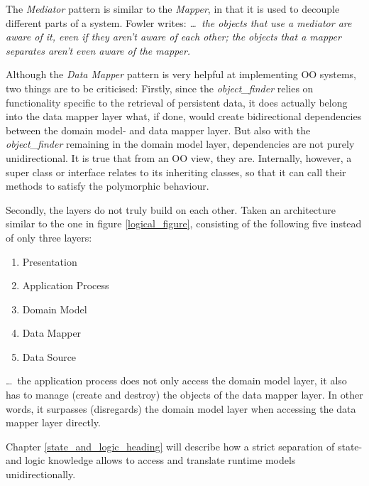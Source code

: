 The \emph{Mediator} pattern \cite{gamma1995} is similar to the \emph{Mapper}, in
that it is used to decouple different parts of a system. Fowler \cite{fowler2002}
writes: \textit{\ldots\ the objects that use a mediator are aware of it, even if
they aren't aware of each other; the objects that a mapper separates aren't even
aware of the mapper.}

Although the \emph{Data Mapper} pattern is very helpful at implementing OO
systems, two things are to be criticised: Firstly, since the \emph{object\_finder}
relies on functionality specific to the retrieval of persistent data, it does
actually belong into the data mapper layer what, if done, would create
bidirectional dependencies between the domain model- and data mapper layer. But
also with the \emph{object\_finder} remaining in the domain model layer,
dependencies are not purely unidirectional. It is true that from an OO view,
they are. Internally, however, a super class or interface relates to its
inheriting classes, so that it can call their methods to satisfy the
polymorphic behaviour.

Secondly, the layers do not truly build on each other. Taken an architecture
similar to the one in figure \ref{logical_figure}, consisting of the following
five instead of only three layers:

\begin{enumerate}
    \item Presentation
    \item Application Process
    \item Domain Model
    \item Data Mapper
    \item Data Source
\end{enumerate}

\ldots\ the application process does not only access the domain model layer, it
also has to manage (create and destroy) the objects of the data mapper layer.
In other words, it surpasses (disregards) the domain model layer when accessing
the data mapper layer directly.

Chapter \ref{state_and_logic_heading} will describe how a strict separation of
state- and logic knowledge allows to access and translate runtime models
unidirectionally.
